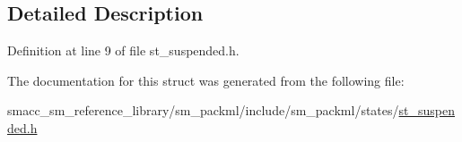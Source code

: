 \subsection{Detailed Description}


Definition at line 9 of file st\+\_\+suspended.\+h.



The documentation for this struct was generated from the following file\+:\begin{DoxyCompactItemize}
\item 
smacc\+\_\+sm\+\_\+reference\+\_\+library/sm\+\_\+packml/include/sm\+\_\+packml/states/\hyperlink{st__suspended_8h}{st\+\_\+suspended.\+h}\end{DoxyCompactItemize}
